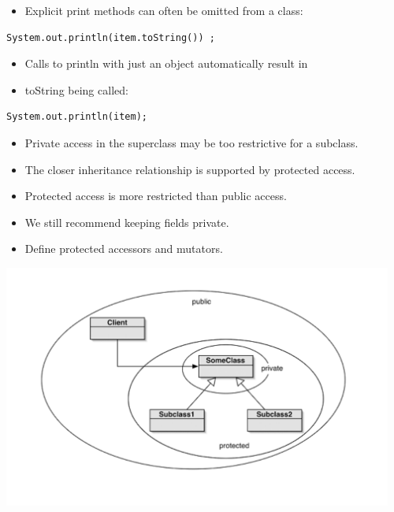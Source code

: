 \documentclass{beamer}
\begin{document}
\begin{frame}[fragile]
\begin{itemize}
\item Explicit print methods can often be omitted from a class:
\end{itemize}
\begin{block}{}
\begin{lstlisting}
System.out.println(item.toString()) ;
\end{lstlisting}
\end{block}
\begin{itemize}
\item Calls to println with just an object automatically result in
\item toString being called:
\end{itemize}
\begin{block}{}
\begin{lstlisting}
System.out.println(item);
\end{lstlisting}
\end{block}
\end{frame}

\begin{frame}
\begin{itemize}
\item Private access in the superclass may be too restrictive for a subclass.
\item The closer inheritance relationship is supported by protected access.
\item Protected access is more restricted than public access.
\item We still recommend keeping fields private.
\item Define protected accessors and mutators.
\end{itemize}
\end{frame}

\begin{frame}
\begin{center}
\includegraphics[height=8cm, keepaspectratio]{images/access}
\end{center}
\end{frame}
\end{document}
